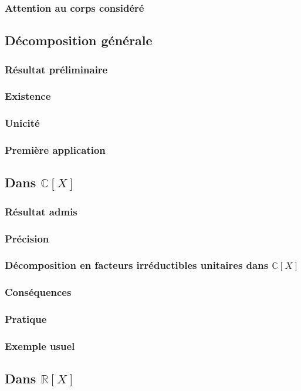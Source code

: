 \documentclass[12pt,a4paper,french]{book}
\begin{document}
			\subsubsection{Attention au corps considéré}
		\subsection{Décomposition générale}
			\subsubsection{Résultat préliminaire}
			\subsubsection{Existence}
			\subsubsection{Unicité}
			\subsubsection{Première application}
		\subsection{Dans $\mathbb{C}[X]$}
			\subsubsection{Résultat admis}
			\subsubsection{Précision}
			\subsubsection{Décomposition en facteurs irréductibles unitaires dans $\mathbb{C}[X]$}
			\subsubsection{Conséquences}
			\subsubsection{Pratique}
			\subsubsection{Exemple usuel}
		\subsection{Dans $\mathbb{R}[X]$}
\end{document}
